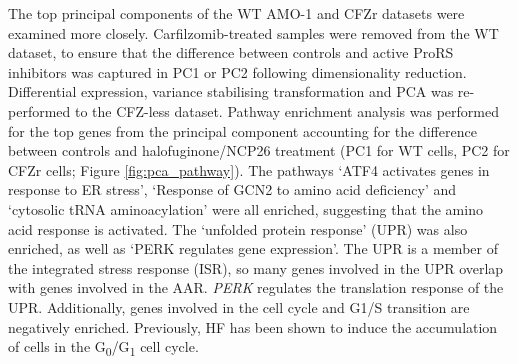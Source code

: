 The top principal components of the WT AMO-1 and CFZr datasets were examined more closely.
Carfilzomib-treated samples were removed from the WT dataset, to ensure that the difference between controls and active ProRS inhibitors was captured in PC1 or PC2 following dimensionality reduction.
Differential expression, variance stabilising transformation and PCA was re-performed to the CFZ-less dataset.
Pathway enrichment analysis was performed for the top genes from the principal component accounting for the difference between controls and halofuginone/NCP26 treatment (PC1 for WT cells, PC2 for CFZr cells; Figure \ref{fig:pca_pathway}).
The pathways `ATF4 activates genes in response to ER stress', `Response of GCN2 to amino acid deficiency' and `cytosolic tRNA aminoacylation' were all enriched, suggesting that the amino acid response is activated.
The `unfolded protein response' (UPR) was also enriched, as well as `PERK regulates gene expression'.
The UPR is a member of the integrated stress response (ISR), so many genes involved in the UPR overlap with genes involved in the AAR\@.
\textit{PERK} regulates the translation response of the UPR\@.
Additionally, genes involved in the cell cycle and G1/S transition are negatively enriched.
Previously, HF has been shown to induce the accumulation of cells in the G\textsubscript{0}/G\textsubscript{1} cell cycle\cite{leiba2012halofuginone}.

